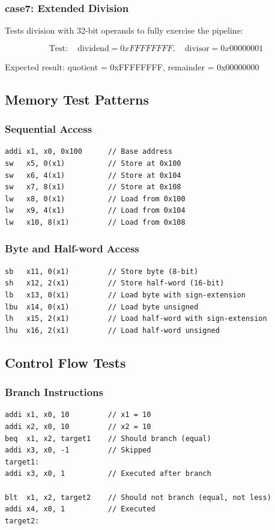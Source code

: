 \documentclass[a4paper, 11pt]{article}
\begin{document}
\subsubsection{case7: Extended Division}
Tests division with 32-bit operands to fully exercise the pipeline:

\begin{equation}
\text{Test}: \quad \text{dividend} = 0xFFFFFFFF, \quad \text{divisor} = 0x00000001
\end{equation}

Expected result: quotient = 0xFFFFFFFF, remainder = 0x00000000

\subsection{Memory Test Patterns}

\subsubsection{Sequential Access}
\begin{lstlisting}[caption=Sequential Memory Access Pattern]
addi x1, x0, 0x100      // Base address
sw   x5, 0(x1)          // Store at 0x100
sw   x6, 4(x1)          // Store at 0x104
sw   x7, 8(x1)          // Store at 0x108
lw   x8, 0(x1)          // Load from 0x100
lw   x9, 4(x1)          // Load from 0x104
lw   x10, 8(x1)         // Load from 0x108
\end{lstlisting}

\subsubsection{Byte and Half-word Access}
\begin{lstlisting}[caption=Byte/Half-word Memory Access]
sb   x11, 0(x1)         // Store byte (8-bit)
sh   x12, 2(x1)         // Store half-word (16-bit)
lb   x13, 0(x1)         // Load byte with sign-extension
lbu  x14, 0(x1)         // Load byte unsigned
lh   x15, 2(x1)         // Load half-word with sign-extension
lhu  x16, 2(x1)         // Load half-word unsigned
\end{lstlisting}

\subsection{Control Flow Tests}

\subsubsection{Branch Instructions}
\begin{lstlisting}[caption=Branch Instruction Patterns]
addi x1, x0, 10         // x1 = 10
addi x2, x0, 10         // x2 = 10
beq  x1, x2, target1    // Should branch (equal)
addi x3, x0, -1         // Skipped
target1:
addi x3, x0, 1          // Executed after branch

blt  x1, x2, target2    // Should not branch (equal, not less)
addi x4, x0, 1          // Executed
target2:
\end{lstlisting}
\end{document}
